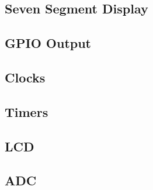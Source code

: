 \documentclass[journal]{IEEEtran}
\begin{document}
\subsection{Seven Segment Display}

\subsection{GPIO Output}

\subsection{Clocks}

\subsection{Timers}

\subsection{LCD}

\subsection{ADC}

%
\end{document}
